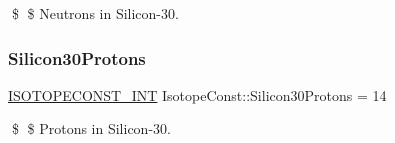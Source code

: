 \$ \$ Neutrons in Silicon-\/30. \mbox{\label{group___isotope_const-_silicon-_si30_ga06c029ce2418e6127abde7faf115aa86}} 
\subsubsection{\texorpdfstring{Silicon30\+Protons}{Silicon30Protons}}
{\footnotesize\ttfamily \mbox{\hyperlink{group___isotope_const-_macros_ga5f18360b3e99483a35c32d789e62621c}{I\+S\+O\+T\+O\+P\+E\+C\+O\+N\+S\+T\+\_\+\+I\+NT}} Isotope\+Const\+::\+Silicon30\+Protons = 14}

\$ \$ Protons in Silicon-\/30. 